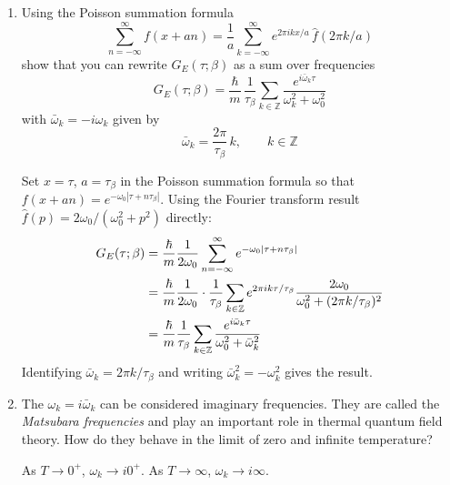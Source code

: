 \begin{enumerate}[label=\alph*), resume]
        \item Using the Poisson summation formula
        \begin{equation}
            \sum_{n=-\infty}^{\infty} f(x + an) = \frac{1}{a}\sum_{k=-\infty}^{\infty} e^{2\pi i k x/a}\,\hat{f}(2\pi k/a)
        \end{equation}
        show that you can rewrite $G_E(\tau;\beta)$ as a sum over frequencies
        \begin{equation}
            G_E(\tau;\beta) = \frac{\hbar}{m}\,\frac{1}{\tau_\beta}
            \sum_{k \in \mathbb{Z}} \frac{e^{i\bar{\omega}_k \tau}}{\omega_k^2 + \omega_0^2}
        \end{equation}
        with $\bar{\omega}_k = -i\omega_k$ given by
        \begin{equation}
            \bar{\omega}_k = \frac{2\pi}{\tau_\beta}\,k, \qquad k \in \mathbb{Z}
        \end{equation}
        \begin{solution}
    Set $x = \tau$, $a = \tau_\beta$ in the Poisson summation formula so that 
    $f(x+an) = e^{-\omega_0|\tau+n\tau_\beta|}$. Using the Fourier transform result 
    $\hat{f}(p) = 2\omega_0/(\omega_0^2+p^2)$ directly:
    \begin{align}
        G_E(\tau;\beta) 
        &= \frac{\hbar}{m}\frac{1}{2\omega_0}
           \sum_{n=-\infty}^{\infty} e^{-\omega_0|\tau+n\tau_\beta|} \notag\\
        &= \frac{\hbar}{m}\frac{1}{2\omega_0}\cdot\frac{1}{\tau_\beta}
           \sum_{k\in\mathbb{Z}} e^{2\pi ik\tau/\tau_\beta}
           \frac{2\omega_0}{\omega_0^2 + (2\pi k/\tau_\beta)^2} \notag\\
        &= \frac{\hbar}{m}\frac{1}{\tau_\beta}
           \sum_{k\in\mathbb{Z}}\frac{e^{i\bar{\omega}_k\tau}}{\omega_0^2+\bar{\omega}_k^2}
    \end{align}
    Identifying $\bar{\omega}_k = 2\pi k/\tau_\beta$ and writing 
    $\bar{\omega}_k^2 = -\omega_k^2$ gives the result.
    \end{solution}
    
        \item The $\omega_k = i\bar{\omega}_k$ can be considered imaginary frequencies. They are called the \textit{Matsubara frequencies} and play an important role in thermal quantum field theory. How do they behave in the limit of zero and infinite temperature?
    \begin{solution}
        As $T \to 0^+$, $\omega_k \to i0^+$. As $T \to \infty$, $\omega_k \to i \infty$.
    \end{solution}
    \end{enumerate}
    
